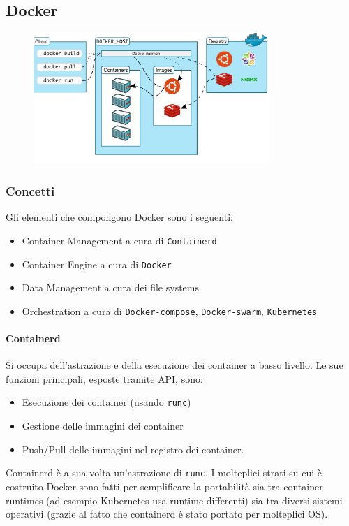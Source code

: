 \documentclass{article}
\begin{document}
		\newpage
		\subsection{Docker}
		\begin{figure}[ht]
		    \centering
		    \includegraphics[width=0.8\textwidth]{SAC_B2_DockerStructure.png}
		\end{figure}
		
		\subsubsection{Concetti}
		Gli elementi che compongono Docker sono i seguenti:
		\begin{itemize}
			\item Container Management a cura di \verb*|Containerd|
			\item Container Engine a cura di \verb*|Docker|
			\item Data Management a cura dei file systems
			\item Orchestration a cura di \verb*|Docker-compose|, \verb*|Docker-swarm|, \verb*|Kubernetes|
		\end{itemize}
		
		\paragraph{Containerd}
		Si occupa dell'astrazione e della esecuzione dei container a basso livello. Le sue funzioni principali, esposte tramite API, sono:
		\begin{itemize}
			\item Esecuzione dei container (usando \verb|runc|)
			\item Gestione delle immagini dei container
			\item Push/Pull delle immagini nel registro dei container.
		\end{itemize}
		Containerd è a sua volta un'astrazione di \verb*|runc|. I molteplici strati su cui è costruito Docker sono fatti per semplificare la portabilità sia tra container runtimes (ad esempio Kubernetes usa runtime differenti) sia tra diversi sistemi operativi (grazie al fatto che containerd è stato portato per molteplici OS).\\
		
\end{document}
